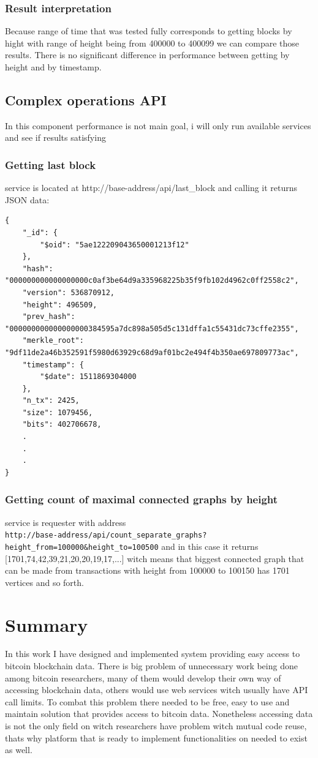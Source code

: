 \documentclass[12pt, en, eng]{mgr}
\begin{document}
\subsubsection{Result interpretation}
Because range of time that was tested fully corresponds to getting blocks by hight with range of height being from 400000 to 400099 we can compare those results. There is no significant difference in performance between getting by height and by timestamp.

\subsection{Complex operations API}
In this component performance is not main goal, i will only run available services and see if results satisfying

\subsubsection{Getting last block}
service is located at http://base-address/api/last\_block and calling it returns JSON data:
\begin{verbatim}
{
    "_id": {
        "$oid": "5ae122209043650001213f12"
    },
    "hash": "000000000000000000c0af3be64d9a335968225b35f9fb102d4962c0ff2558c2",
    "version": 536870912,
    "height": 496509,
    "prev_hash": "000000000000000000384595a7dc898a505d5c131dffa1c55431dc73cffe2355",
    "merkle_root": "9df11de2a46b352591f5980d63929c68d9af01bc2e494f4b350ae697809773ac",
    "timestamp": {
        "$date": 1511869304000
    },
    "n_tx": 2425,
    "size": 1079456,
    "bits": 402706678,
    .
    .
    .
}
\end{verbatim}

\subsubsection{Getting count of maximal connected graphs by height}
service is requester with address
\\ \verb|http://base-address/api/count_separate_graphs?height_from=100000&height_to=100500|
and in this case it returns [1701,74,42,39,21,20,20,19,17,...] witch means that biggest connected graph that can be made from transactions with height from 100000 to 100150 has 1701 vertices and so forth.




\section{Summary}
In this work I have designed and implemented system providing easy access to bitcoin blockchain data. There is big problem of unnecessary work being done among bitcoin researchers, many of them would develop their own way of accessing blockchain data, others would use web services witch usually have API call limits. To combat this problem there needed to be free, easy to use and maintain solution that provides access to bitcoin data. 
Nonetheless accessing data is not the only field on witch researchers have problem witch mutual code reuse, thats why platform that is ready to implement functionalities on needed to exist as well. 
\end{document}
